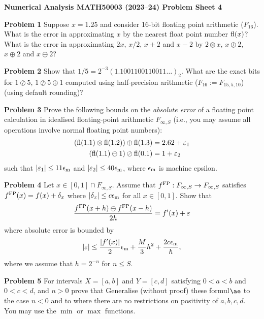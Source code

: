 \documentclass[12pt,a4paper]{article}
\def\endash{–}
\begin{document}
\textbf{Numerical Analysis MATH50003 (2023\ensuremath{\endash}24) Problem Sheet 4}

\textbf{Problem 1} Suppose $x = 1.25$ and consider 16-bit floating point arithmetic ($F_{16}$). What is the error in approximating $x$ by the nearest float point number ${\rm fl}(x)$? What is the error in approximating $2x$, $x/2$, $x + 2$ and $x - 2$ by $2 \otimes x$, $x \oslash 2$, $x \ensuremath{\oplus} 2$ and $x \ominus 2$?

\textbf{Problem 2} Show that $1/5 = 2^{-3} (1.1001100110011\ensuremath{\ldots})_2$. What are the exact bits for $1 \ensuremath{\oslash} 5$, $1 \ensuremath{\oslash} 5 \ensuremath{\oplus} 1$ computed using  half-precision arithmetic ($F_{16} := F_{15,5,10}$) (using default rounding)?

\textbf{Problem 3} Prove the following bounds on the \emph{absolute error} of a floating point calculation in idealised floating-point arithmetic $F_{\ensuremath{\infty},S}$ (i.e., you may assume all operations involve normal floating point numbers):
\begin{align*}
({\rm fl}(1.1) \ensuremath{\otimes} {\rm fl}(1.2)) &\ensuremath{\oplus} {\rm fl}(1.3) = 2.62 + \ensuremath{\varepsilon}_1 \\
({\rm fl}(1.1) \ensuremath{\ominus} 1) & \ensuremath{\oslash} {\rm fl}(0.1) = 1 + \ensuremath{\varepsilon}_2
\end{align*}
such that $|\ensuremath{\varepsilon}_1| \ensuremath{\leq} 11 \ensuremath{\epsilon}_{\rm m}$ and $|\ensuremath{\varepsilon}_2| \ensuremath{\leq} 40 \ensuremath{\epsilon}_{\rm m}$, where $\ensuremath{\epsilon}_{\rm m}$ is machine epsilon.

\textbf{Problem 4} Let $x \ensuremath{\in} [0,1] \ensuremath{\cap} F_{\ensuremath{\infty},S}$. Assume that $f^{\rm FP} : F_{\ensuremath{\infty},S} \ensuremath{\rightarrow} F_{\ensuremath{\infty},S}$ satisfies $f^{\rm FP}(x) = f(x) + \ensuremath{\delta}_x$ where $|\ensuremath{\delta}_x| \ensuremath{\leq} c \ensuremath{\epsilon}_{\rm m}$ for all $x \ensuremath{\in} [0,1]$. Show that
\[
{f^{\rm FP}(x+h) \ensuremath{\ominus} f^{\rm FP}(x-h) \over  2h} = f'(x) + \ensuremath{\varepsilon}
\]
where absolute error is bounded by
\[
|\ensuremath{\varepsilon}| \ensuremath{\leq} {|f'(x)| \over 2} \ensuremath{\epsilon}_{\rm m} + {M \over 3} h^2 + {2 c \ensuremath{\epsilon}_{\rm m} \over h},
\]
where we assume  that $h = 2^{-n}$ for $n \ensuremath{\leq} S$.

\textbf{Problem 5} For intervals  $X = [a,b]$ and $Y = [c,d]$ satisfying $0 < a < b$ and $0 < c < d$, and $n > 0$ prove that
Generalise (without proof) these formul\ensuremath{\ae} to the case $n < 0$ and to where there are no restrictions on positivity of $a,b,c,d$. You may use the $\min$ or $\max$ functions.
\end{document}
